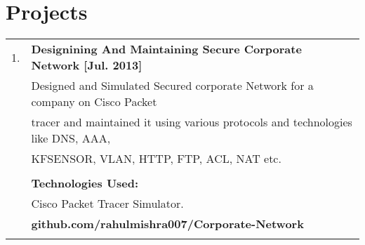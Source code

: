 \documentclass[a4paper,10pt]{article}
\begin{document}
\section{Projects}
\begin{tabular}{rl}
 \textsc{1.} & {\large\textbf{Designining And Maintaining Secure Corporate Network [Jul. 2013]}}\\ & \textsc Designed and Simulated Secured corporate Network for a company on Cisco Packet\\ & tracer and maintained it using various protocols and technologies like DNS, AAA, \\ & KFSENSOR, VLAN, HTTP, FTP, ACL, NAT etc.\\ & \\ &
 \normalsize\textbf{Technologies Used:}\\ & Cisco Packet Tracer Simulator.\\ &
 \normalsize\textbf{github.com/rahulmishra007/Corporate-Network}\\ & \\


\end{tabular}
\end{document}
